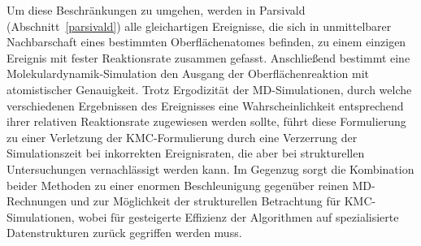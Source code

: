 Um diese Beschränkungen zu umgehen, werden in Parsivald (Abschnitt~\ref{parsivald}) alle gleichartigen Ereignisse, die sich in unmittelbarer Nachbarschaft eines bestimmten Oberflächenatomes befinden, zu einem einzigen Ereignis mit fester Reaktionsrate zusammen gefasst.
Anschließend bestimmt eine Molekulardynamik-Simulation den Ausgang der Oberflächenreaktion mit atomistischer Genauigkeit.
Trotz Ergodizität der MD-Simulationen, durch welche verschiedenen Ergebnissen des Ereignisses eine Wahrscheinlichkeit entsprechend ihrer relativen Reaktionsrate zugewiesen werden sollte, führt diese Formulierung zu einer Verletzung der KMC-Formulierung durch eine Verzerrung der Simulationszeit bei inkorrekten Ereignisraten, die aber bei strukturellen Untersuchungen vernachlässigt werden kann.
Im Gegenzug sorgt die Kombination beider Methoden zu einer enormen Beschleunigung gegenüber reinen MD-Rechnungen und zur Möglichkeit der strukturellen Betrachtung für KMC-Simulationen, wobei für gesteigerte Effizienz der Algorithmen auf spezialisierte Datenstrukturen zurück gegriffen werden muss.
